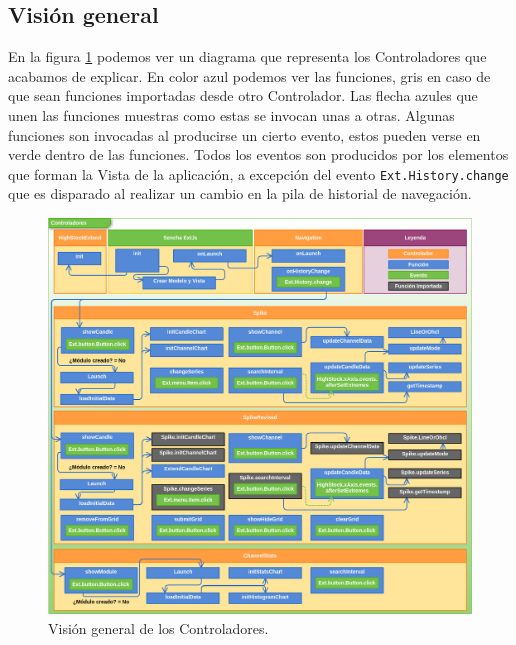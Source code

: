 	\subsection{Visión general}
		En la figura \ref{fig:controllers} podemos ver un diagrama que representa los Controladores que acabamos de explicar. En color azul
		podemos ver las funciones, gris en caso de que sean funciones importadas desde otro Controlador. Las flecha azules que unen las
		funciones muestras como estas se invocan unas a otras. Algunas funciones son invocadas al producirse un cierto evento, estos pueden
		verse en verde dentro de las funciones. Todos los eventos son producidos por los elementos que forman la Vista de la aplicación, a
		excepción del evento \texttt{Ext.History.change} que es disparado al realizar un cambio en la pila de historial de navegación.
		\begin{figure}[h]
			\centering
			\includegraphics[keepaspectratio, width=1\textwidth]{./img/controllers.png}
			\caption{Visión general de los Controladores.}   
			\label{fig:controllers}
		\end{figure}
